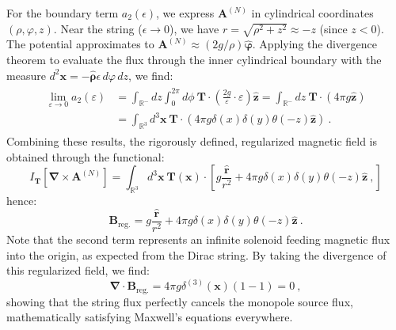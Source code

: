 \documentclass[a4paper,11pt]{article}
\begin{document}
 For the boundary term $a_2(\epsilon)$, we express $\boldsymbol A^{(N)}$ in cylindrical coordinates $(\rho, \varphi, z)$. Near the string ($\epsilon \to 0$), we have $r = \sqrt{\rho^2 + z^2} \approx -z$ (since $z < 0$). The potential approximates to $\boldsymbol A^{(N)} \approx (2g/\rho)\hat{\boldsymbol \varphi}$. Applying the divergence theorem to evaluate the flux through the inner cylindrical boundary with the measure $d^2\boldsymbol x = -\hat{\boldsymbol \rho}\epsilon \, d\varphi \, dz$, we find:
 \begin{align}
    \begin{split}
        \lim_{\varepsilon \to 0} a_2(\varepsilon) &= \int_{\mathbb{R}^-} dz \int_0^{2\pi} d\phi\ \boldsymbol{T} \cdot \left( \frac{2g}{\varepsilon} \cdot \varepsilon \right) \hat{\boldsymbol z}= \int_{\mathbb{R}^-} dz\  \boldsymbol{T} \cdot (4\pi g \hat{\boldsymbol z})\\
        &=\int_{\mathbb{R}^3} d^3\boldsymbol x\ \boldsymbol{T} \cdot (4\pi g \delta(x) \delta(y) \theta(-z) \hat{\boldsymbol z})\ .
    \end{split}
 \end{align}
Combining these results, the rigorously defined, regularized magnetic field is obtained through the functional:
 \begin{equation}
    I_{\boldsymbol{T}}[\boldsymbol{\nabla} \times \boldsymbol{A}^{(N)}] = \int_{\mathbb{R}^3} d^3\boldsymbol x\ \boldsymbol{T}(\boldsymbol x) \cdot \left[ g \frac{\hat{\boldsymbol r}}{r^2} + 4\pi g \delta(x) \delta(y) \theta(-z) \hat{\boldsymbol z}\ , \right]
 \end{equation}
 hence:
 \begin{equation}
    \boldsymbol{B}_{\text{reg.}} = g \frac{\hat{\boldsymbol r}}{r^2} + 4\pi g \delta(x) \delta(y) \theta(-z) \hat{\boldsymbol z}\ .
 \end{equation}
Note that the second term represents an infinite solenoid feeding magnetic flux into the origin, as expected from the Dirac string. By taking the divergence of this regularized field, we find:
 \begin{equation}
    \boldsymbol{\nabla} \cdot \boldsymbol{B}_{\text{reg.}} = 4\pi g \delta^{(3)}(\boldsymbol{x})(1 - 1)=0\ ,
 \end{equation}
showing that the string flux perfectly cancels the monopole source flux, mathematically satisfying Maxwell's equations everywhere.
\end{document}
